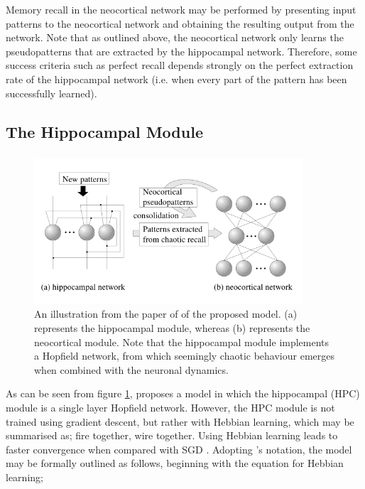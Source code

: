 Memory recall in the neocortical network may be performed by presenting input patterns to the neocortical network and obtaining the resulting output from the network. Note that as outlined above, the neocortical network only learns the pseudopatterns that are extracted by the hippocampal network. Therefore, some success criteria such as perfect recall depends strongly on the perfect extraction rate of the hippocampal network (i.e. when every part of the pattern has been successfully learned).

\subsection{The Hippocampal Module}
\subsubsection{\cite{Hattori2010}}
\begin{figure}
\centering
\includegraphics[width=10cm]{fig/hattori2010_model_structure}
\caption{An illustration from the paper of \cite{Hattori2010} of the proposed model. (a) represents the hippocampal module, whereas (b) represents the neocortical module. Note that the hippocampal module implements a Hopfield network, from which seemingly chaotic behaviour emerges when combined with the neuronal dynamics.}
\label{fig:hattori2010_model_structure}
\end{figure}

As can be seen from figure \ref{fig:hattori2010_model_structure}, \cite{Hattori2010} proposes a model in which the hippocampal (HPC) module is a single layer Hopfield network. However, the HPC module is not trained using gradient descent, but rather with Hebbian learning, which may be summarised as; fire together, wire together. Using Hebbian learning leads to faster convergence when compared with SGD \citep{Hattori2010}. Adopting \cite{Hattori2010}'s notation, the model may be formally outlined as follows, beginning with the equation for Hebbian learning;

